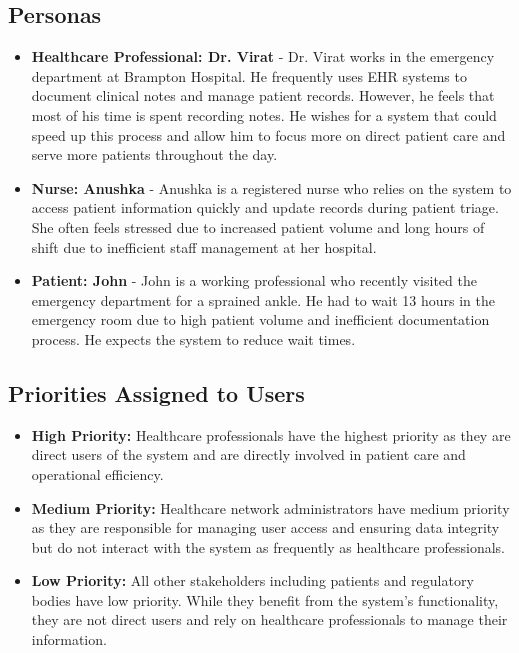 \documentclass[12pt]{article}
\begin{document}
\subsection{Personas}
\begin{itemize}
    \item \textbf{Healthcare Professional: Dr. Virat} - Dr. Virat works in the emergency department at Brampton Hospital. He frequently uses EHR systems to document clinical notes and manage patient records. However, he feels that most of his time is spent recording notes. He wishes for a system that could speed up this process and allow him to focus more on direct patient care and serve more patients throughout the day.
    \item \textbf{Nurse: Anushka} - Anushka is a registered nurse who relies on the system to access patient information quickly and update records during patient triage. She often feels stressed due to increased patient volume and long hours of shift due to inefficient staff management at her hospital.
    \item \textbf{Patient: John} - John is a working professional who recently visited the emergency department for a sprained ankle. He had to wait 13 hours in the emergency room due to high patient volume and inefficient documentation process. He expects the system to reduce wait times.
\end{itemize}

\subsection{Priorities Assigned to Users}
\begin{itemize}
    \item \textbf{High Priority:} Healthcare professionals have the highest priority as they are direct users of the system and are directly involved in patient care and operational efficiency.
    \item \textbf{Medium Priority:} Healthcare network administrators have medium priority as they are responsible for managing user access and ensuring data integrity but do not interact with the system as frequently as healthcare professionals.
    \item \textbf{Low Priority:} All other stakeholders including patients and regulatory bodies have low priority. While they benefit from the system's functionality, they are not direct users and rely on healthcare professionals to manage their information.
\end{itemize}
\end{document}
